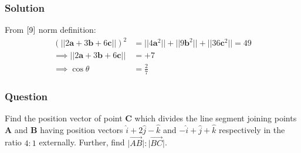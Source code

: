 \documentclass{beamer}
\providecommand{\brak}[1]{\ensuremath{\left(#1\right)}}
\theoremstyle{remark}
\let\vec\mathbf
\begin{document}
\begin{frame}
\frametitle{Solution}
From $\eqref{9}$ norm definition:
    \begin{align}
        \brak{\lvert \lvert 2\vec{a} + 3\vec{b} + 6\vec{c} \rvert \rvert}^2 &= \lvert \lvert 4\vec{a}^2 \rvert \rvert + \lvert \lvert 9\vec{b}^2 \rvert \rvert + \lvert \lvert 36\vec{c}^2  \rvert \rvert = 49\\
    \implies \lvert \lvert 2\vec{a} + 3\vec{b} + 6\vec{c} \rvert \rvert &= +7\\
    \implies \cos{\theta} &= \frac{2}{7}
\end{align}
    
\end{frame}







\begin{frame}
\frametitle{Question }
Find the position vector of point $\vec{C}$ which divides the line segment joining points $\vec{A}$ and $\vec{B}$ having position vectors $\hat{i} + 2\hat{j} - \hat{k}$ and $-\hat{i} + \hat{j} + \hat{k}$ respectively in the ratio $4:1$ externally. Further, find $\lvert \overrightarrow{AB}\rvert : \lvert \overrightarrow{BC} \rvert$. 
\end{frame}
\end{document}
